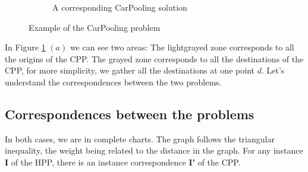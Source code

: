 \documentclass[12pt, a4paper, twoside]{memoir}
\newcommand{\newpar}{\vskip 0.2in \noindent}
\newcommand\tab[1][1cm]{\hspace*{#1}}
\begin{document}
{\begin{figure}[H]
\begin{subfigure}{.5\textwidth}
			\caption{A corresponding CarPooling solution}
		\end{subfigure}
		\caption{Example of the CarPooling problem}
		\label{fig:Example of the CarPooling problem}
	\end{figure}
	
	\noindent In Figure \ref{fig:Example of the CarPooling problem} $(a)$ we can see two areas: \newline
	\tab The lightgrayed zone corresponds to all the origins of the CPP.\newline
	\tab The grayed zone corresponds to all the destinations of the CPP, for more simplicity, we gather all the destinations at one point $d$.
	\newpar
	Let's understand the correspondences between the two problems.
	
	\subsection{Correspondences between the problems}
	
	In both cases, we are in complete charts. The graph follows the triangular inequality, the weight being related to the distance in the graph. \newline
	For any instance \textbf{I} of the HPP, there is an instance correspondence \textbf{I'} of the CPP.
	
}
\end{document}
